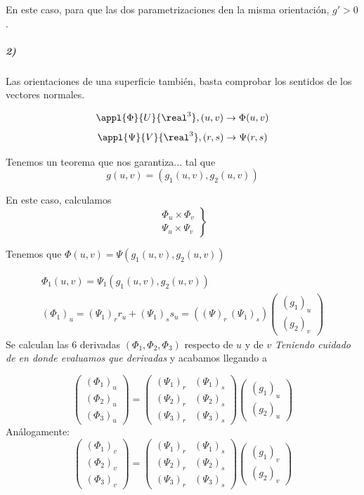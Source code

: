 En este caso, para que las dos parametrizaciones den la misma orientación, $g'>0$.

\subparagraph{2)} Las orientaciones de una superficie también, basta comprobar los sentidos de los vectores normales.

\[\appl{\Phi}{U}{\real^3}, (u,v) \to \Phi(u,v)\]
\[\appl{\Psi}{V}{\real^3}, (r,s) \to \Psi(r,s)\]

Tenemos un teorema que nos garantiza... tal que \[g(u,v) = (g_1(u,v),g_2(u,v))\]

En este caso, calculamos \[\left.\begin{array}{c}
\Phi_u\times\Phi_v \\
\Psi_u\times\Psi_v
\end{array}\right\}\]

Tenemos que $\Phi(u,v) = \Psi(g_1(u,v),g_2(u,v))$

\begin{gather*}
\Phi_1(u,v) = \Psi_1(g_1(u,v),g_2(u,v))\\
(\Phi_1)_{u} = (\Psi_1)_r r_u + (\Psi_1)_s s_u = ((\Psi)_r\,(\Psi_1)_s)\begin{pmatrix}
(g_1)_u\\(g_2)_v
\end{pmatrix}
\end{gather*}
Se calculan las 6 derivadas $(\Phi_1,\Phi_2,\Phi_3)$ respecto de $u$ y de $v$ \emph{Teniendo cuidado de en donde evaluamos que derivadas} y acabamos llegando a

\[\begin{pmatrix}
(\Phi_1)_u\\(\Phi_2)_u\\(\Phi_3)_u
\end{pmatrix} = \begin{pmatrix}
(\Psi_1)_r & (\Psi_1)_s\\
(\Psi_2)_r & (\Psi_2)_s\\
(\Psi_3)_r & (\Psi_3)_s
\end{pmatrix}\begin{pmatrix}
(g_1)_u\\
(g_2)_u
\end{pmatrix}
\]
Análogamente:
\[\begin{pmatrix}
(\Phi_1)_v\\(\Phi_2)_v\\(\Phi_3)_v
\end{pmatrix} = \begin{pmatrix}
(\Psi_1)_r & (\Psi_1)_s\\
(\Psi_2)_r & (\Psi_2)_s\\
(\Psi_3)_r & (\Psi_3)_s
\end{pmatrix}\begin{pmatrix}
(g_1)_v\\
(g_2)_v
\end{pmatrix}
\]

